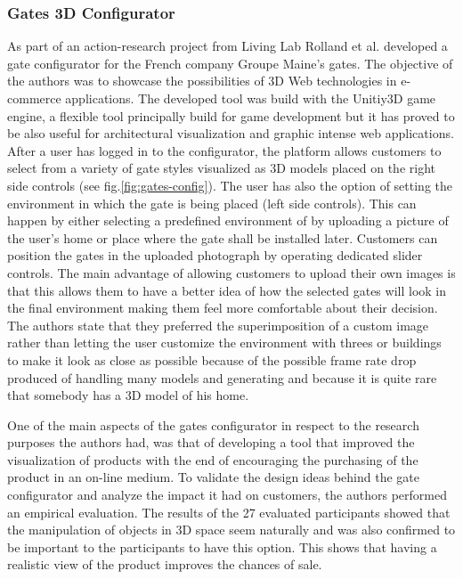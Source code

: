 \documentclass[../medieninformatik-arbeit.tex]{subfiles}
\begin{document}
\subsubsection{Gates 3D Configurator}
As part of an action-research project from Living
Lab\cite{livinglabs:2015:Online} Rolland et al.\cite{rolland2012commerce}
developed a gate configurator for the French company Groupe Maine's gates. The
objective of the authors was to showcase the possibilities of 3D Web
technologies in e-commerce applications. The developed tool was build with the
Unitiy3D\cite{unity3d:2015:Online} game engine, a flexible tool principally
build for game development but it has proved to be also useful for architectural
visualization and graphic intense web applications. After a user has logged in
to the configurator, the platform allows customers to select from a variety of
gate styles visualized as 3D models placed on the right side controls (see fig.\ref{fig:gates-config}). The user has also the option of setting the environment in which the gate is being placed (left side controls). This can happen by either selecting a predefined environment of by uploading a picture of the user's home or place where the gate shall be installed later. Customers can position the gates in the uploaded photograph by operating dedicated slider controls. The main advantage of allowing customers to upload their own images is that this allows them to have a better idea of how the selected gates will look in the final environment making them feel more comfortable about their decision. The authors state that they preferred the superimposition of a custom image rather than letting the user customize the environment with threes or buildings to make it look as close as possible because of the possible frame rate drop produced of handling many models and generating and because it is quite rare that somebody has a 3D model of his home. 

One of the main aspects of the gates configurator in respect to the research purposes the authors had, was that of developing a tool that improved the visualization of products with the end of encouraging the purchasing of the product in an on-line medium. To validate the design ideas behind the gate configurator and analyze the impact it had on customers, the authors performed an empirical evaluation. The results of the 27 evaluated participants showed that the manipulation of objects in 3D space seem naturally and was also confirmed to be important to the participants to have this option. This shows that having a realistic view of the product improves the chances of sale.
\end{document}

